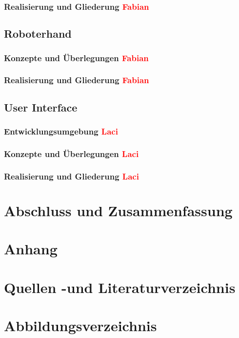 \documentclass[11pt]{article}
\begin{document}
\subsubsection{Realisierung und Gliederung \textcolor{red}{Fabian}}

\subsection{Roboterhand}
\subsubsection{Konzepte und Überlegungen \textcolor{red}{Fabian}}
\subsubsection{Realisierung und Gliederung \textcolor{red}{Fabian}}

\subsection{User Interface}
\subsubsection{Entwicklungsumgebung \textcolor{red}{Laci}}
\subsubsection{Konzepte und Überlegungen \textcolor{red}{Laci}}
\subsubsection{Realisierung und Gliederung \textcolor{red}{Laci}}


\section{Abschluss und Zusammenfassung}


\section{Anhang}
\section{Quellen -und Literaturverzeichnis}
\section{Abbildungsverzeichnis}
\end{document}
